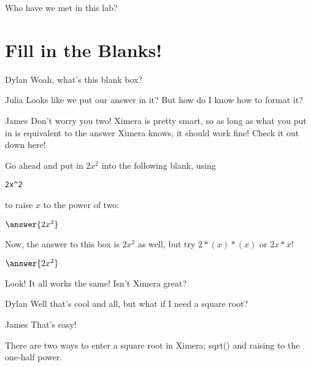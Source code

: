 \documentclass{ximera}
\begin{document}
\begin{question}
Who have we met in this lab?
\begin{selectAll}
\end{selectAll}
\end{question}

\section{Fill in the Blanks!}
\begin{dialogue}
\item[Dylan] Woah, what's this blank box?
\item[Julia] Looks like we put our answer in it? But how do I know how to format it?
\item[James] Don't worry you two! Ximera is pretty smart, so as long as what you put in is equivalent to the answer Ximera knows, it should work fine! Check it out down here!
\end{dialogue}

\begin{question}
Go ahead and put in $2x^2$ into the following blank, using
\begin{verbatim}
2x^2
\end{verbatim}
to raise $x$ to the power of two:

$\answer{2x^2}$
\end{question}
\begin{question}
Now, the answer to this box is $2x^2$ as well, but try $2*(x)*(x)$ or $2x*x$!

$\answer{2x^2}$
\begin{feedback}[correct]
Look! It all works the same! Isn't Ximera great?
\end{feedback}
\end{question}

\begin{dialogue}
\item[Dylan] Well that's cool and all, but what if I need a square root?
\item[James] That's easy!
\end{dialogue}

There are two ways to enter a square root in Ximera; sqrt() and raising to the one-half power.
\end{document}
